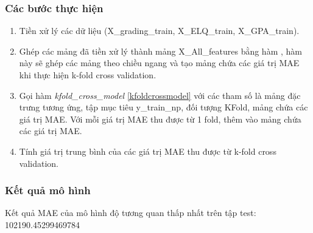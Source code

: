 \documentclass[]{article}
\begin{document}
\begin{itemize}
  \subsubsection{Các bước thực hiện}
  \begin{enumerate}
    \item Tiền xử lý các dữ liệu (X\_grading\_train, X\_ELQ\_train, X\_GPA\_train). 
    \item Ghép các mảng đã tiền xử lý thành mảng X\_All\_features bằng hàm , hàm này sẽ ghép các mảng theo chiều ngang và tạo mảng chứa các giá trị MAE khi thực hiện k-fold cross validation.
    \item Gọi hàm \textit{kfold\_cross\_model} \ref{kfoldcrossmodel} với các tham số là mảng đặc trưng tương ứng, tập mục tiêu y\_train\_np, đối tượng KFold, mảng chứa các giá trị MAE. Với mỗi giá trị MAE thu được từ 1 fold, thêm vào mảng chứa các giá trị MAE.
    \item Tính giá trị trung bình của các giá trị MAE thu được từ k-fold cross validation.
  \end{enumerate}

\end{itemize}

\subsubsection{Kết quả mô hình}
\begin{table}[!h]
  \centering
\end{table}

Kết quả MAE của mô hình độ tương quan thấp nhất trên tập test: 102190.45299469784
\end{document}
